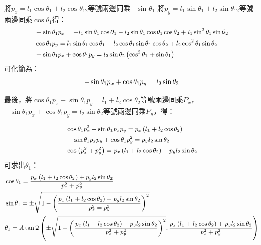 \documentclass[class=NCU_thesis, crop=false]{standalone}
\begin{document}
將$p_{x}=l_1 \cos \theta_1+l_2 \cos \theta_{12}$等號兩邊同乘$-\sin \theta_1$
將$p_{y}=l_1 \sin \theta_1+l_2 \sin \theta_{12}$等號兩邊同乘$\cos \theta_1$得：
$$
\begin{small}
\begin{aligned}
& -\sin \theta_1 p_{x}=-l_1 \sin \theta_1 \cos \theta_1-l_2 \sin \theta_1 \cos \theta_1 \cos \theta_2+l_1 \sin^2 \theta_1 \sin \theta_2 \\
& \cos \theta_1 p_{y}=l_1 \sin \theta_1 \cos \theta_1+l_2 \cos \theta_1 \sin \theta_1 \cos \theta_2+l_2 \cos^2 \theta_1 \sin \theta_2 \\
& -\sin \theta_1 p_{x}+\cos \theta_1 p_{y}=l_2 \sin \theta_2\left(\cos^2 \theta_1+\sin \theta_1\right)
\end{aligned}
\end{small}
$$
可化簡為：
$$
\begin{small}
-\sin \theta_1 p_{x} + \cos \theta_1 p_{y} = l_2 \sin \theta_2
\end{small}
$$

最後，將$\cos \theta_1 p_{x}+\sin \theta_1 p_{y}=l_1+l_2 \cos \theta_2$等號兩邊同乘$P_x$，$-\sin \theta_1 p_{x} + \cos \theta_1 p_{y} = l_2 \sin \theta_2$等號兩邊同乘$P_y$，得：

$$
\begin{small}
\begin{aligned}
& \cos \theta_1 p_{x}^2 + \sin \theta_1 p_x p_y = p_x \left(l_1 + l_2 \cos \theta_2 \right) \\
& - \sin \theta_1 p_x p_y + \cos \theta_1 p_{y}^2 = p_y l_2 \sin \theta_2 \\
& \cos \left(p_{x}^2+p_{y}^2 \right) = p_x \left(l_1+l_2 \cos \theta_2 \right) - p_y l_2 \sin \theta_2
\end{aligned}
\end{small}
$$
可求出$\theta_1$：
$$
\begin{small}
\begin{aligned}
& \cos \theta_1= \frac{p_x \left(l_1+l_2 \cos \theta_2 \right)+p_y l_2 \sin \theta_2}{p_x^2 + p_y^2} \\
& \sin \theta_1= \pm \sqrt{1-\left(\frac{p_{x} \left(l_1 + l_2 \cos \theta_2 \right)+p_y l_2 \sin \theta_2}{p_x^2 = p_y^2}\right)^2} \\
& \theta_1=A \tan 2\left( \pm \sqrt{1-\left(\frac{p_{x}\left(l_1+l_2 \cos \theta_2\right)+p_{y} l_2 \sin \theta_2}{p_{x}^2+p_{y}^2}\right)^2}, \frac{p_{x}\left(l_1+l_2 \cos \theta_2\right)+p_{y} l_2 \sin \theta_2}{p_{x}^2+p_{y}^2}\right)
\end{aligned}
\end{small}
$$
\end{document}
